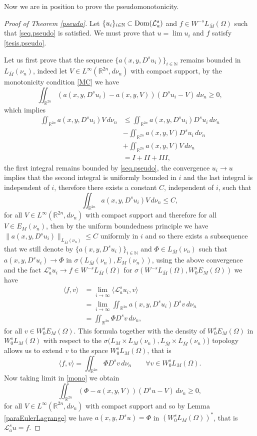 \documentclass{amsart}
\def\Dom{\text{\normalfont Dom}}
\newcommand{\A}{\mathcal{L}_a^s}
\newcommand{\R}{{\mathbb R}}
\newcommand{\N}{{\mathbb N}}
\theoremstyle{remark}
\theoremstyle{definition}
\numberwithin{equation}{section}
\begin{document}
Now we are in position to prove the pseudomonotonicity.
\begin{proof}[Proof of Theorem \ref{pseudo}]
Let $\{u_i\}_{i\in \N} \subset \Dom(\A)$ and $f\in  W^{-s}L_{\bar{M}}(\Omega)$ such that \eqref{seq.pseudo} is satisfied. 
We must prove that $u=\lim u_i$ and $f$ satisfy \eqref{tesis.pseudo}.


Let us first prove that the sequence $\{a(x,y,D^s u_i)\}_{i \in \N}$ remains bounded in $L_{\bar{M}}(\nu_n)$, indeed let $V \in L^{\infty}(\R^{2n},d\nu_n)$ with compact support, by the monotonicity condition \eqref{MC} we have 
\begin{equation}\label{mono}
\iint_{\R^{2n}} (a(x,y,D^s u_i)-a(x,y,V))(D^s u_i-V)\, d\nu_n\geq 0,
\end{equation}
which implies
\begin{align*}
\iint_{\R^{2n}} a(x,y,D^s u_i)V\,d\nu_n&\leq \iint_{\R^{2n}} a(x,y,D^s u_i)D^s u_i\,d\nu_n
\\
&-\iint_{\R^{2n}} a(x,y,V)D^s u_i\,d\nu_n
\\
&+\iint_{\R^{2n}} a(x,y,V)V\,d\nu_n
\\
&=I+II+III,
\end{align*}
the first integral remains bounded by \eqref{seq.pseudo}, the convergence $u_i\to u$ implies that the second integral is uniformly bounded in $i$ and the last integral is independent of $i$, therefore there exists a constant $C$, independent of $i$, such that
$$
\iint_{\R^{2n}} a(x,y,D^s u_i)V\,d\nu_n\leq C,
$$
for all $V\in L^{\infty}(\R^{2n},d\nu_n)$ with compact support and therefore for all $V\in E_M(\nu_n)$, then by the uniform boundedness principle we have $\|a(x,y,D^s u_i)\|_{L_{\bar{M}}(\nu_n)}\leq C$ uniformly in $i$ and so there exists a subsequence that we still denote by $\{a(x,y,D^s u_i)\}_{i\in \N}$ and   $\Phi\in L_{\bar{M}}(\nu_n)$ such that $a(x,y,D^su_i)\to \Phi$ in $\sigma(L_{\bar{M}}(\nu_n),E_M(\nu_n))$, using the above convergence and the fact $\A u_i \to f \in W^{-s}L_{\bar{M}}(\Omega)$ for $\sigma(W^{-s}L_{\bar{M}}(\Omega),W_0^sE_M(\Omega))$ we have
\begin{align*}
\langle f,v \rangle
&=\lim_{i\to\infty} \langle \A u_i,v\rangle
\\
&=\lim_{i\to\infty}\iint_{\R^{2n}}a(x,y,D^s u_i)D^sv\,d\nu_n
\\
&=\iint_{\R^{2n}}\Phi D^s v\,d\nu_n,
\end{align*}
for all $v\in W_0^sE_M(\Omega)$. This formula together with the density of $W_0^s
E_M(\Omega)$ in $W_0^s
L_M(\Omega)$ with respect to the $\sigma(L_M\times L_M(\nu_n),L_{\bar{M}}\times L_{\bar{M}}(\nu_n)$) topology allows us to extend $v$ to the space $W_0^sL_M(\Omega)$, that is
\begin{equation}\label{deff}
\langle f,v \rangle=\iint_{\R^{2n}}\Phi D^s v\,d\nu_n\qquad \forall v\in W_0^s L_M(\Omega).	
\end{equation}
Now taking limit in \eqref{mono} we obtain
$$
\iint_{\R^{2n}} (\Phi-a(x,y,V))(D^s u-V)\, d\nu_n\geq 0,
$$
for all $V\in L^{\infty}(\R^{2n},d\nu_n)$ with compact support and so by Lemma \ref{paraEulerLagrange} we have $a(x,y,D^s u)=\Phi$ in $(W_0^sL_M(\Omega))^*$, that is $\A u=f$.


\end{proof}
\end{document}
